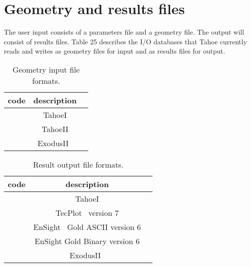 

\section{Geometry and results files}
\label{sect.files}
The user input consists of a parameters file and a geometry
file.  The output will consist of results files.  Table 25 describes the
I/O databases that Tahoe currently reads and writes as geometry files for
input and as results files for output.

\begin{table}[h]
\caption{\label{tab.input.file.type} Geometry input file formats.}
\begin{center}
\begin{tabular}[c]{|l|c|c|}
\hline
 \parbox[b]{0.75in}{\centering \textbf{code}}
&\parbox[b]{2.0in}{\raggedright \textbf{description}}\\
\hline
\parbox[b]{0.75in}{} & 
\parbox[b]{2.0in}{\raggedright TahoeI}\\
\hline
\parbox[b]{0.75in}{}  & 
\parbox[b]{2.0in}{\raggedright TahoeII}\\
\hline
\parbox[b]{0.75in}{}  & 
\parbox[b]{2.0in}{\raggedright \textsf{ExodusII}~\cite{ExodusII}}\\
\hline
\end{tabular}
\end{center}
\end{table}

\begin{table}[h]
\caption{\label{tab.input.file.type} Result output file formats.}
\begin{center}
\begin{tabular}[c]{|l|c|c|}
\hline
 \parbox[b]{0.75in}{\centering \textbf{code}}
&\parbox[b]{2.0in}{\raggedright \textbf{description}}\\
\hline
\parbox[b]{0.75in}{} & 
\parbox[b]{2.0in}{\raggedright TahoeI}\\
\hline
\parbox[b]{0.75in}{}  & 
\parbox[b]{2.0in}{\raggedright \textsf{TecPlot}~\cite{TecPlot} version 7}\\
\hline
\parbox[b]{0.75in}{}  & 
\parbox[b]{2.0in}{\raggedright \textsf{EnSight}~\cite{EnSight} Gold ASCII 
version 6}\\
\hline
\parbox[b]{0.75in}{}  & 
\parbox[b]{2.0in}{\raggedright \textsf{EnSight} Gold Binary version 6}\\
\hline
\parbox[b]{0.75in}{}  & 
\parbox[b]{2.0in}{\raggedright \textsf{ExodusII}~\cite{ExodusII}}\\
\hline
\end{tabular}
\end{center}
\end{table}
